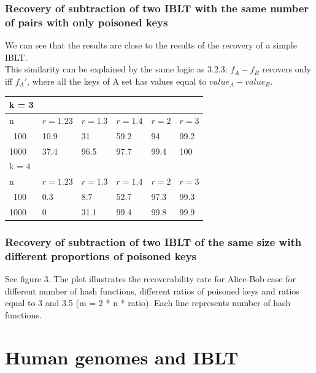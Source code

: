 \documentclass{article}
\begin{document}
\subsubsection{Recovery of subtraction of two IBLT with the same number of pairs with only poisoned keys}
We can see that the results are close to the results of the recovery of a simple IBLT.
\\
This similarity can be explained by the same logic as 3.2.3: $f_A - f_B$ recovers 
only iff $f_A'$, where all the keys of A set has values equal to 
$value_A - value_B$.
\begin{center}
\begin{tabular}{l | l | l | l | l | l} \hline \hline k = 3 \\ \hline
    \hline n & $r = 1.23$ &  $r = 1.3$  &  $r = 1.4$ & $r = 2$ & $r = 3$\\ \hline
    \hline \ 100 & 10.9 & 31 & 59.2 & 94 & 99.2 \\ \hline 
    1000 & 37.4 & 96.5 & 97.7 & 99.4 & 100 \\ \hline
    \hline
    k = 4 \\
    \hline
    \hline n & $r = 1.23$ &  $r = 1.3$  &  $r = 1.4$ & $r = 2$ & $r = 3$\\ \hline
    \hline \ 100 & 0.3 & 8.7 & 52.7 & 97.3 & 99.3 \\ \hline 
    1000 & 0 & 31.1 & 99.4 & 99.8 & 99.9 \\ \hline
\end{tabular}
\end{center}


\subsubsection{Recovery of subtraction of two IBLT of the same size with different proportions of poisoned keys}
See figure 3. The plot illustrates the recoverability rate for Alice-Bob case
for different number of hash functions, different ratios of poisoned keys and 
ratios equal to 3 and 3.5 (m = 2 * n * ratio). Each line represents number of hash 
functions.

\section{Human genomes and IBLT}
\end{document}
